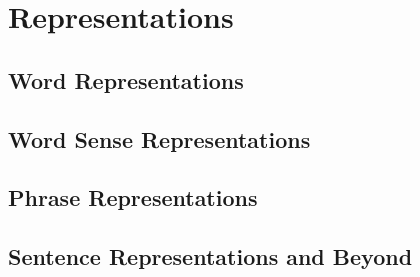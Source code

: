 \documentclass[12pt,parskip]{scrbook}
\begin{document}
\part{Representations}\label{sec:representations}
\chapter{Word Representations}\label{sec:word-representations}

\textcite{NPLM}


\chapter{Word Sense Representations}\label{sec:word-sense-representations}
\chapter{Phrase Representations}\label{sec:phrase-representations}
\chapter{Sentence Representations and Beyond}\label{sec:sentence-representations-and-beyond}
\end{document}
